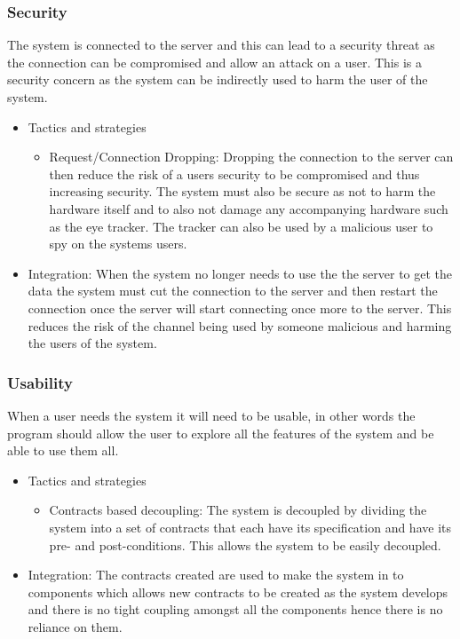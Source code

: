 \subsubsection{Security}	
\begin{flushleft}
The system is connected to the server and this can lead to a security threat as the connection can be compromised and allow an attack on a user. This is a security concern as the system can be indirectly used to harm the user of the system.
\begin{itemize}
\item{Tactics and strategies}
\begin{itemize}
\item{Request/Connection Dropping}: Dropping the connection to the server can then reduce the risk of a users security to be compromised and thus increasing security. The system must also be secure as not to harm the hardware itself and to also not damage any accompanying hardware such as the eye tracker. The tracker can also be used by a malicious user to spy on the systems users.

\end{itemize}

\item{Integration}: When the system no longer needs to use the the server to get the data the system must cut the connection to the server and then restart the connection once the server will start connecting once more to the server. This reduces the risk of the channel being used by someone malicious and harming the users of the system.
\end{itemize}

\end{flushleft}	
\fi
\subsubsection{Usability}
\begin{flushleft}
When a user needs the system it will need to be usable, in other words the program should allow the user to explore all the features of the system and be able to use them all.
\begin{itemize}
\item{Tactics and strategies}
\begin{itemize}
\item{Contracts based decoupling}: The system is decoupled by dividing the system into a set of contracts that each have its specification and have its pre- and post-conditions. This allows the system to be easily decoupled.

\end{itemize}

\item{Integration}: The contracts created are used to make the system in to components which allows new contracts to be created as the system develops and there is no tight coupling amongst all the components hence there is no reliance on them.
\end{itemize}

\end{flushleft}
		
